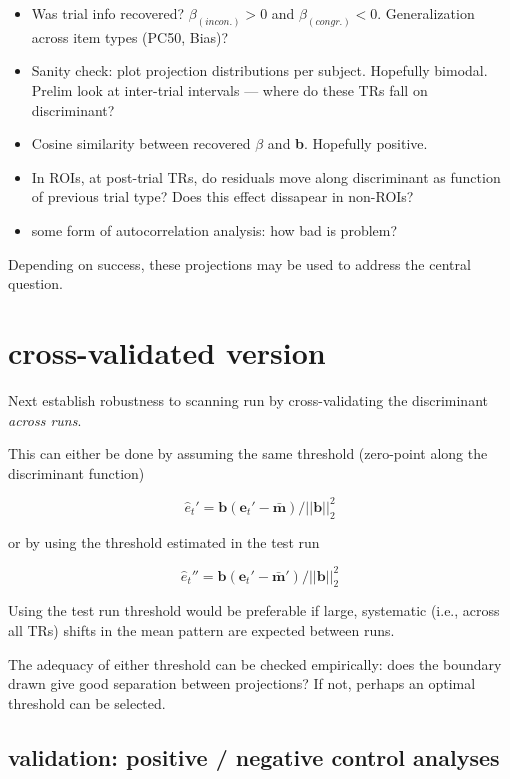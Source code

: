 \documentclass{article}\usepackage[]{graphicx}\usepackage[]{color}
\begin{document}
\begin{itemize}
  \item Was trial info recovered? $\beta_\mathit{(incon.)} > 0$ and $\beta_\mathit{(congr.)} < 0$. Generalization across item types (PC50, Bias)?
  \item Sanity check: plot projection distributions per subject. Hopefully bimodal. Prelim look at inter-trial intervals --- where do these TRs fall on discriminant?
  \item Cosine similarity between recovered $\beta$ and \textbf{b}. Hopefully positive.
  \item In ROIs, at post-trial TRs, do residuals move along discriminant as function of previous trial type? Does this effect dissapear in non-ROIs?
  \item some form of autocorrelation analysis: how bad is problem?
\end{itemize}

Depending on success, these projections may be used to address the central question.

\section*{cross-validated version}

Next establish robustness to scanning run by cross-validating the discriminant \textit{across runs}.

This can either be done by assuming the same threshold (zero-point along the discriminant function)

\[\hat{e}_t' = \mathbf{b} (\mathbf{e}_t' - \bar{\mathbf{m}}) / ||\mathbf{b}||^2_2 \]

or by using the threshold estimated in the test run

\[\hat{e}_t'' = \mathbf{b} (\mathbf{e}_t' - \bar{\mathbf{m}}') / ||\mathbf{b}||^2_2\]

Using the test run threshold would be preferable if large, systematic (i.e., across all TRs) shifts in the mean pattern are expected between runs.

The adequacy of either threshold can be checked empirically: does the boundary drawn give good separation between projections?
If not, perhaps an optimal threshold can be selected.

\subsection*{validation: positive / negative control analyses}
\end{document}

